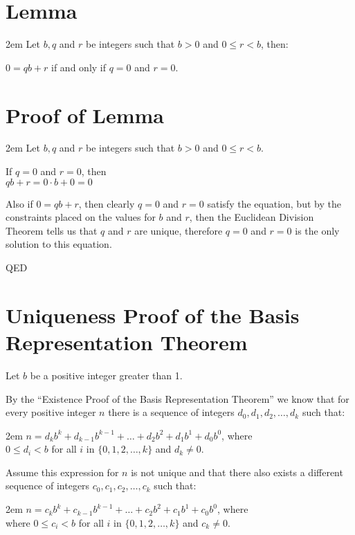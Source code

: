 \documentclass{article}
\newenvironment{jprIn}{\begin{adjustwidth}{2em}{}}{\end{adjustwidth}}
\begin{document}
\section*{Lemma}
\begin{jprIn}
Let $b, q$ and $r$ be integers such that $b>0$ and $0\le{}r<b$, then:
\begin{center}
$0=qb+r$ 
\hspace{1.5em}if and only if\hspace{1.5em}
$q=0$ and $r=0$.
\end{center}
\end{jprIn}

\section*{Proof of Lemma}
\begin{jprIn}
Let $b, q$ and $r$ be integers such that $b>0$ and $0\le{}r<b$.

If $q=0$ and $r=0$, then \\
\hphantom{2em}$qb+r=0\cdot{}b+0=0$

Also if $0=qb+r$, then
clearly
$q=0$ and $r=0$ satisfy the equation,
but by the constraints
placed on the values for $b$ and $r$, then the Euclidean Division Theorem tells us
that $q$ and $r$ are unique, therefore 
$q=0$ and $r=0$ is the only solution to this equation.

QED
\end{jprIn}

\break
\section*{Uniqueness Proof of the Basis Representation Theorem}

Let $b$ be a positive integer greater than 1.

By the ``Existence Proof of the Basis Representation Theorem'' we know
that for every positive integer $n$ there is a sequence
of integers $d_0, d_1, d_2,\dots{},d_k$ such that:
\begin{jprIn}
$n=d_kb^k+d_{k-1}b^{k-1}+\dots+d_2b^2+d_1b^1+d_0b^0$, where\\
\hphantom{2em}$0\le{}d_i<b$ for all $i$ in $\{0,1,2,\dots{},k\}$ and $d_k\ne0$.
\end{jprIn}

Assume this expression for $n$ is not unique and that there also exists
a different sequence
of integers $c_0, c_1, c_2,\dots{},c_k$ such that:
\begin{jprIn}
$n=c_kb^k+c_{k-1}b^{k-1}+\dots+c_2b^2+c_1b^1+c_0b^0$, where\\
\hphantom{2em}where $0\le{}c_i<b$ for all $i$ in $\{0,1,2,\dots{},k\}$ and $c_k\ne0$.
\end{jprIn}
\end{document}
